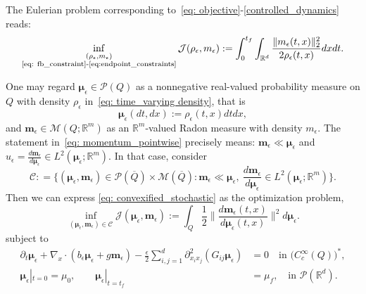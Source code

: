 \documentclass{amsart}
\numberwithin{equation}{section}
\newcommand{\R}{\mathbb{R}}
\begin{document}
The Eulerian problem corresponding to~\eqref{eq: objective}-\eqref{controlled_dynamics} reads:
\begin{equation}\label{eq: convexified_stochastic}
\inf_{\substack{(\rho_{\epsilon}, m_{\epsilon})\\ \text{\eqref{eq: fb_constraint}-\eqref{eq:endpoint_constraints}}}} \mathcal{J}(\rho_{\epsilon},m_{\epsilon}):=
\int_0^{t_f} \int_{\mathbb R^d}
\frac{\| m_{\epsilon}(t,x) \|_2^2}{2   \rho_{\epsilon}(t,x)}   dx   dt.
\end{equation}

One may regard $\boldsymbol\mu_{\epsilon}\in \mathcal P(Q)$ as a nonnegative real-valued probability measure on $Q$ with density $\rho_{\epsilon}$ in~\eqref{eq: time_varying density}, that is
\[
\boldsymbol\mu_{\epsilon}(dt,dx):=\rho_{\epsilon}(t,x) dt dx,
\]
and $\mathbf m_{\epsilon} \in\mathcal{M}(Q;\R^m)$ as an $\R^m$-valued Radon measure with density $m_{\epsilon}$. The statement in~\eqref{eq: momentum_pointwise} precisely means: $\mathbf m_{\epsilon}\ll \boldsymbol\mu_{\epsilon}$ and $u_{\epsilon}=\frac{d\mathbf m_{\epsilon}}{d\boldsymbol\mu_{\epsilon}}\in L^2(\boldsymbol\mu_{\epsilon};\R^m)$. In that case, consider
\[
 \mathcal C: =\bigl\{ (\boldsymbol\mu_{\epsilon}, \mathbf m_{\epsilon})\in \mathcal{P}(\overline Q)\times \mathcal{M}(\overline Q) : \mathbf m_{\epsilon}\ll \boldsymbol\mu_{\epsilon},\ 
\frac{d\mathbf m_{\epsilon}}{d\boldsymbol\mu_{\epsilon}}\in L^2(\boldsymbol\mu_{\epsilon};\R^m) \bigr\}.
\]
Then we can express \eqref{eq: convexified_stochastic} as the optimization problem,
\begin{equation}\label{measure_theoretic_objective}
\inf_{(\boldsymbol\mu_{\epsilon}, \mathbf m_{\epsilon})\in\mathcal C} 
\mathcal{J}(\boldsymbol\mu_{\epsilon}, \mathbf m_{\epsilon}):=
\int_Q \frac12\Big\|\frac{d\mathbf m_{\epsilon}(t,x)}{d\boldsymbol\mu_{\epsilon}(t,x)}\Big\|^2 d\boldsymbol\mu_{\epsilon}.%
\end{equation}
subject to
\begin{subequations}
\begin{align}
   \partial_t \boldsymbol\mu_{\epsilon}
+ \nabla_x \cdot \left(b_{\epsilon}\boldsymbol\mu_{\epsilon}+g\mathbf m_{\epsilon}\right)
- \frac{\epsilon}{2} \sum_{i,j=1}^d 
\partial_{ x_i  x_j}^2 (G_{ij} \boldsymbol\mu_{\epsilon} )
&= 0\quad\text{in } \bigl(C_c^\infty(Q)\bigr)^{*},\label{eq: fb_measure_constraint}\\
    \boldsymbol\mu_{\epsilon}|_{t=0} = \mu_0, 
    \qquad 
    \boldsymbol\mu_{\epsilon}|_{t=t_f} &= \mu_f,\quad\text{in } \mathcal P(\R^d).\label{eq:endpoint_measure_constraints}
\end{align}
\end{subequations}
\end{document}
